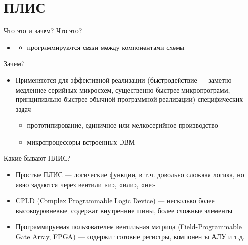 \documentclass[xetex,aspectratio=43]{beamer}
\begin{document}
\section{ПЛИС}

\begin{frame}{Что это и зачем?}
        Что это?

        \begin{itemize}
            \tightlist
            \item

            \begin{itemize}
                \tightlist
                \item
                программируются связи между компонентами схемы
            \end{itemize}
        \end{itemize}

        Зачем?

        \begin{itemize}
            \tightlist
            \item
            Применяются для эффективной реализации (быстродействие --- заметно
            медленнее серийных микросхем, существенно быстрее микропрограмм,
            принципиально быстрее обычной программной реализации) специфических
            задач

            \begin{itemize}
                \tightlist
                \item
                прототипирование, единичное или мелкосерийное производство
                \item
                микропроцессоры встроенных ЭВМ
            \end{itemize}
        \end{itemize}
\end{frame}

\begin{frame}{Какие бывают ПЛИС?}
        \begin{itemize}
            \tightlist
            \item
            Простые ПЛИС --- логические функции, в т.ч. довольно сложная логика,
            но явно задаются через вентили «и», «или», «не»
            \item
            CPLD (Complex Programmable Logic Device) --- несколько более
            высокоуровневые, содержат внутренние шины, более сложные элементы
            \item
            Программируемая пользователем вентильная матрица (Field-Programmable
            Gate Array, FPGA) --- содержит готовые регистры, компоненты АЛУ и т.д.
        \end{itemize}
\end{frame}
\end{document}
